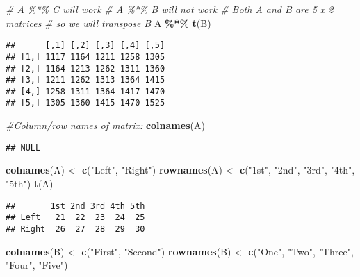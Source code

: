 \documentclass[
]{article}
\newenvironment{Shaded}{\begin{snugshade}}{\end{snugshade}}
\newcommand{\CommentTok}[1]{\textcolor[rgb]{0.56,0.35,0.01}{\textit{#1}}}
\newcommand{\FunctionTok}[1]{\textcolor[rgb]{0.13,0.29,0.53}{\textbf{#1}}}
\newcommand{\NormalTok}[1]{#1}
\newcommand{\OtherTok}[1]{\textcolor[rgb]{0.56,0.35,0.01}{#1}}
\newcommand{\SpecialCharTok}[1]{\textcolor[rgb]{0.81,0.36,0.00}{\textbf{#1}}}
\newcommand{\StringTok}[1]{\textcolor[rgb]{0.31,0.60,0.02}{#1}}
\begin{document}
\begin{Shaded}
\begin{Highlighting}[]
\CommentTok{\# A \%*\% C will work}
\CommentTok{\# A \%*\% B will not work}
\CommentTok{\# Both A and B are 5 x 2 matrices}
\CommentTok{\# so we will transpose B}
\NormalTok{A }\SpecialCharTok{\%*\%} \FunctionTok{t}\NormalTok{(B)}
\end{Highlighting}
\end{Shaded}

\begin{verbatim}
##      [,1] [,2] [,3] [,4] [,5]
## [1,] 1117 1164 1211 1258 1305
## [2,] 1164 1213 1262 1311 1360
## [3,] 1211 1262 1313 1364 1415
## [4,] 1258 1311 1364 1417 1470
## [5,] 1305 1360 1415 1470 1525
\end{verbatim}

\begin{Shaded}
\begin{Highlighting}[]
\CommentTok{\#Column/row names of matrix:}
\FunctionTok{colnames}\NormalTok{(A)}
\end{Highlighting}
\end{Shaded}

\begin{verbatim}
## NULL
\end{verbatim}

\begin{Shaded}
\begin{Highlighting}[]
\FunctionTok{colnames}\NormalTok{(A) }\OtherTok{\textless{}{-}} \FunctionTok{c}\NormalTok{(}\StringTok{"Left"}\NormalTok{, }\StringTok{"Right"}\NormalTok{)}
\FunctionTok{rownames}\NormalTok{(A) }\OtherTok{\textless{}{-}} \FunctionTok{c}\NormalTok{(}\StringTok{"1st"}\NormalTok{, }\StringTok{"2nd"}\NormalTok{,}
\StringTok{"3rd"}\NormalTok{, }\StringTok{"4th"}\NormalTok{, }\StringTok{"5th"}\NormalTok{)}
\FunctionTok{t}\NormalTok{(A)}
\end{Highlighting}
\end{Shaded}

\begin{verbatim}
##       1st 2nd 3rd 4th 5th
## Left   21  22  23  24  25
## Right  26  27  28  29  30
\end{verbatim}

\begin{Shaded}
\begin{Highlighting}[]
\FunctionTok{colnames}\NormalTok{(B) }\OtherTok{\textless{}{-}} \FunctionTok{c}\NormalTok{(}\StringTok{"First"}\NormalTok{,}
\StringTok{"Second"}\NormalTok{)}
\FunctionTok{rownames}\NormalTok{(B) }\OtherTok{\textless{}{-}} \FunctionTok{c}\NormalTok{(}\StringTok{"One"}\NormalTok{, }\StringTok{"Two"}\NormalTok{,}
\StringTok{"Three"}\NormalTok{, }\StringTok{"Four"}\NormalTok{, }\StringTok{"Five"}\NormalTok{)}
\end{Highlighting}
\end{Shaded}
\end{document}
